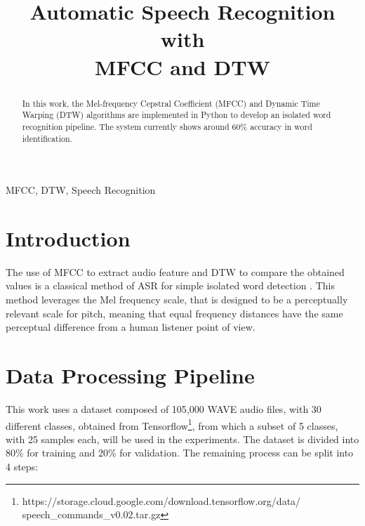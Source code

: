 \documentclass[conference]{IEEEtran}
\begin{document}
\begin{acronym}
\end{acronym}

\title{Automatic Speech Recognition with \\ MFCC and DTW \\}
\author{
}

\maketitle

\begin{abstract}
In this work, the Mel-frequency Cepstral Coefficient (MFCC) and 
Dynamic Time Warping (DTW) algorithms are implemented in 
Python to develop an isolated word recognition pipeline.
The system currently shows around 60\% accuracy in word identification.
\end{abstract}

\begin{IEEEkeywords}
MFCC, DTW, Speech Recognition 
\end{IEEEkeywords}

\section{Introduction}
The use of \ac{MFCC}\cite{dash2012speaker} to extract audio feature 
and \ac{DTW}\cite{sakoe1978dynamic} to compare the obtained values is 
a classical method of \ac{ASR} for simple isolated word 
detection \cite{muda2010voice}. This method leverages the Mel frequency 
scale, that is designed to be a perceptually relevant scale for pitch, 
meaning that equal frequency distances have the same perceptual 
difference from a human listener point of view. 

\section{Data Processing Pipeline}
This work uses a dataset composed of 105,000 WAVE audio files, with 30 different 
classes, obtained from Tensorflow\footnote{https://storage.cloud.google.com/download.tensorflow.org/data/\\
speech\_commands\_v0.02.tar.gz}, from which a subset of 5 classes, with 25 samples each, 
will be used in the experiments. The dataset is divided into 80\% for training 
and 20\% for validation. The remaining process can be split into 4 steps:
\end{document}
